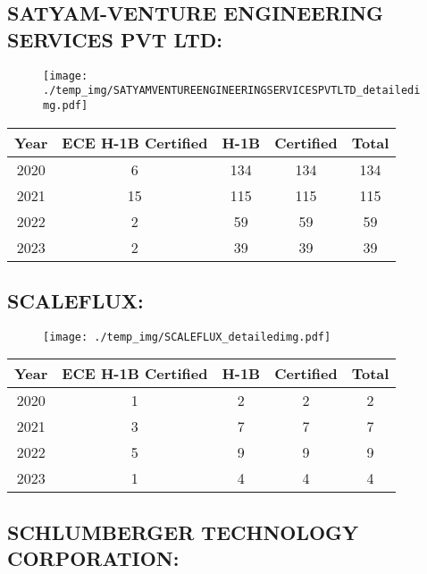 \documentclass{article}%
\begin{document}
%
\newpage%
\subsection{SATYAM{-}VENTURE ENGINEERING SERVICES PVT LTD:}%
\label{subsec:SATYAM{-}VENTUREENGINEERINGSERVICESPVTLTD}%
\label{SATYAMVENTUREENGINEERINGSERVICESPVTLTDdetailed}%


\begin{figure}[htbp]%
\centering%
\texttt{[image: ./temp\_img/SATYAMVENTUREENGINEERINGSERVICESPVTLTD\_detailedimg.pdf]}%
\end{figure}

%
\begin{longtable}{c|c|c|c|c}%
\hline%
Year&ECE H{-}1B Certified&H{-}1B&Certified&Total\\%
\hline%
2020&6&134&134&134\\%
\hline%
2021&15&115&115&115\\%
\hline%
2022&2&59&59&59\\%
\hline%
2023&2&39&39&39\\%
\hline%
\end{longtable}

%
\newpage%
\subsection{SCALEFLUX:}%
\label{subsec:SCALEFLUX}%
\label{SCALEFLUXdetailed}%


\begin{figure}[htbp]%
\centering%
\texttt{[image: ./temp\_img/SCALEFLUX\_detailedimg.pdf]}%
\end{figure}

%
\begin{longtable}{c|c|c|c|c}%
\hline%
Year&ECE H{-}1B Certified&H{-}1B&Certified&Total\\%
\hline%
2020&1&2&2&2\\%
\hline%
2021&3&7&7&7\\%
\hline%
2022&5&9&9&9\\%
\hline%
2023&1&4&4&4\\%
\hline%
\end{longtable}

%
\newpage%
\subsection{SCHLUMBERGER TECHNOLOGY CORPORATION:}%
\label{subsec:SCHLUMBERGERTECHNOLOGYCORPORATION}%
\label{SCHLUMBERGERTECHNOLOGYCORPORATIONdetailed}%
\end{document}

